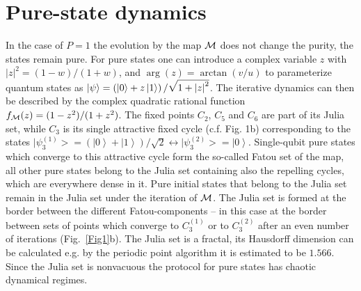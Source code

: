 \documentclass[%
 aip,
 amsmath,amssymb,
 reprint,%
]{revtex4-1}
\begin{document}
\section{Pure-state dynamics}
In the case of $P\!\!=\!\!1$ the evolution by the map $\cal M$ does not change the purity, the states remain pure. 
For pure states one can introduce a complex variable $z$ with $\left|z\right|^2=(1-w)/(1+w)$, and $\arg(z)=\arctan(v/u)$ to parameterize quantum states as $\left|\psi\right>=\left(\left|0\right>+z\left|1\right>\right)/\sqrt{\smash[b]{1+\left|z\right|^{2}}}$. The iterative dynamics can then be described by the complex quadratic rational function \cite{Milnor,MilnorGD,Kiss2011,Andras,Torres} $f_{\cal M}(z)=(1-z^2)/(1+z^2)$. The fixed points $C_{2}$, $C_{5}$ and $C_{6}$ are part of its Julia set, while $C_{3}$ is its single attractive fixed cycle (c.f. Fig. 1b) corresponding to the states $\big|\psi_{3}^{(1)}\big>=\left(\left|0\right>+\left|1\right>\right)/\sqrt{2}\leftrightarrow 
\big|\psi_{3}^{(2)}\big>=\left|0\right>$. Single-qubit pure states which converge to this attractive cycle form the so-called Fatou set of the map, all other pure states belong to the Julia set containing also the repelling cycles, which are everywhere dense in it. Pure initial states that belong to the Julia set remain in the Julia set under the iteration of $\cal M$. The Julia set is formed at the border between the different Fatou-components -- in this case at the border between sets of points which converge to $C_3^{(1)}$ or to $C_3^{(2)}$ after an even number of iterations (Fig.~\ref{Fig1}b). The Julia set is a fractal, its Hausdorff dimension can be calculated e.g. by the periodic point algorithm it is estimated\cite{Andras_private_comm} to be $1.566$. Since the Julia set is nonvacuous \cite{Milnor} the protocol for pure states has chaotic dynamical regimes.

\end{document}
